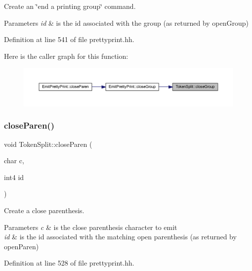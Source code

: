 Create an \char`\"{}end a printing group\char`\"{} command. 


\begin{DoxyParams}{Parameters}
{\em id} & is the id associated with the group (as returned by open\+Group) \\
\hline
\end{DoxyParams}


Definition at line 541 of file prettyprint.\+hh.

Here is the caller graph for this function\+:
\nopagebreak
\begin{figure}[H]
\begin{center}
\leavevmode
\includegraphics[width=350pt]{class_token_split_af01c0522ada54a8d777e6b9a1b840794_icgraph}
\end{center}
\end{figure}
\mbox{\label{class_token_split_a713ced640b138dbe6931c2eb5dd7ddbe}} 
\subsubsection{\texorpdfstring{closeParen()}{closeParen()}}
{\footnotesize\ttfamily void Token\+Split\+::close\+Paren (\begin{DoxyParamCaption}\item[{char}]{c,  }\item[{int4}]{id }\end{DoxyParamCaption})\hspace{0.3cm}{\ttfamily [inline]}}



Create a close parenthesis. 


\begin{DoxyParams}{Parameters}
{\em c} & is the close parenthesis character to emit \\
\hline
{\em id} & is the id associated with the matching open parenthesis (as returned by open\+Paren) \\
\hline
\end{DoxyParams}


Definition at line 528 of file prettyprint.\+hh.

